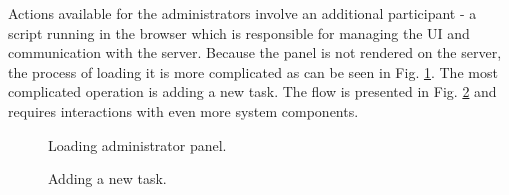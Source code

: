 Actions available for the administrators involve an additional participant - a script running in the browser which is responsible for managing the UI and communication with the server. Because the panel is not rendered on the server, the process of loading it is more complicated as can be seen in Fig. \ref{fig:seq-admin-load}. The most complicated operation is adding a new task. The flow is presented in Fig. \ref{fig:seq-admin-add-task} and requires interactions with even more system components.

\begin{figure}
    \centering
    
    \caption{Loading administrator panel.}
    \label{fig:seq-admin-load}
\end{figure}

\begin{figure}
    \centering
    
    \caption{Adding a new task.}
    \label{fig:seq-admin-add-task}
\end{figure}
